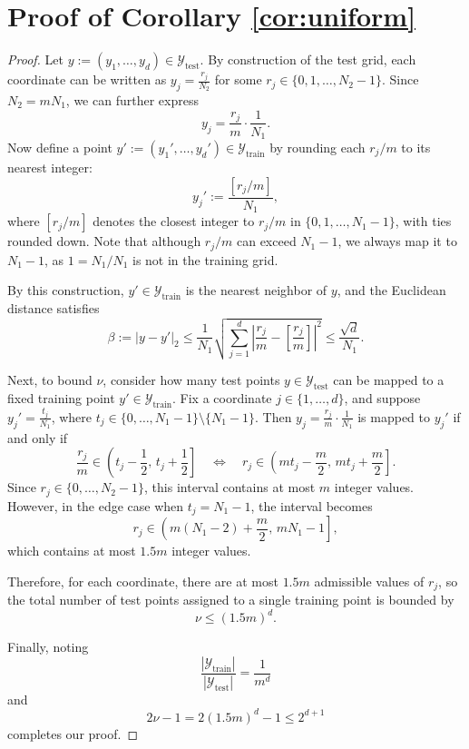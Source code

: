 \documentclass[11pt]{article}
\theoremstyle{plain}
\newcommand{\Ycal}{\mathcal{Y}}
\begin{document}
\section{Proof of Corollary \ref{cor:uniform}}\label{appdx:proof_corr}



\begin{proof}
    \noindent
Let $y := (y_1, \ldots, y_d) \in \Ycal_{\mathrm{test}}$. By construction of the test grid, each coordinate can be written as $y_j = \frac{r_j}{N_2}$ for some $r_j \in \{0,1,\ldots,N_2 - 1\}$. Since $N_2 = m N_1$, we can further express
\[
y_j = \frac{r_j}{m} \cdot \frac{1}{N_1}.
\]
Now define a point $y' := (y_1', \ldots, y_d') \in \Ycal_{\mathrm{train}}$ by rounding each $r_j/m$ to its nearest integer:
\[
y_j' := \frac{[r_j/m]}{N_1},
\]
where $[r_j/m]$ denotes the closest integer to $r_j/m$ in $\{0, 1, \ldots, N_1 - 1\}$, with ties rounded down. Note that although $r_j/m$ can exceed $N_1 - 1$, we always map it to $N_1 - 1$, as $1 = N_1/N_1$ is not in the training grid.

By this construction, $y' \in \Ycal_{\mathrm{train}}$ is the nearest neighbor of $y$, and the Euclidean distance satisfies
\[
\beta := |y - y'|_2 \leq \frac{1}{N_1} \sqrt{ \sum_{j=1}^d \left| \frac{r_j}{m} - \left[ \frac{r_j}{m} \right] \right|^2 } \leq \frac{\sqrt{d}}{N_1}.
\]


\medskip 
Next, to bound $\nu$, consider how many test points $y \in \Ycal_{\mathrm{test}}$ can be mapped to a fixed training point $y' \in \Ycal_{\mathrm{train}}$. Fix a coordinate $j \in \{1, \ldots, d\}$, and suppose $y_j' = \frac{t_j}{N_1}$, where $t_j \in \{0, \ldots, N_1 - 1\} \setminus \{N_1-1\}$. Then $y_j = \frac{r_j}{m} \cdot \frac{1}{N_1}$ is mapped to $y_j'$ if and only if
\[
\frac{r_j}{m} \in \left(t_j - \frac{1}{2},\, t_j + \frac{1}{2} \right] \quad \Longleftrightarrow \quad r_j \in \left( m t_j - \frac{m}{2},\, m t_j + \frac{m}{2} \right].
\]
Since $r_j \in \{0, \ldots, N_2 - 1\}$, this interval contains at most $m$ integer values. However, in the edge case when $t_j = N_1 - 1$, the interval becomes
\[
r_j \in \left( m(N_1 - 2) + \frac{m}{2},\, m N_1 - 1 \right],
\]
which contains at most $1.5m$ integer values.

Therefore, for each coordinate, there are at most $1.5m$ admissible values of $r_j$, so the total number of test points assigned to a single training point is bounded by
\[
\nu \leq (1.5m)^d.
\]



Finally, noting 
\[\frac{|\Ycal_{\mathrm{train}}|}{|\Ycal_{\mathrm{test}}|} = \frac{1}{m^d}\]
and 
\[2\nu-1 = 2 (1.5m)^d -1 \leq 2^{d+1}\]
completes our proof.
\end{proof}
\end{document}
